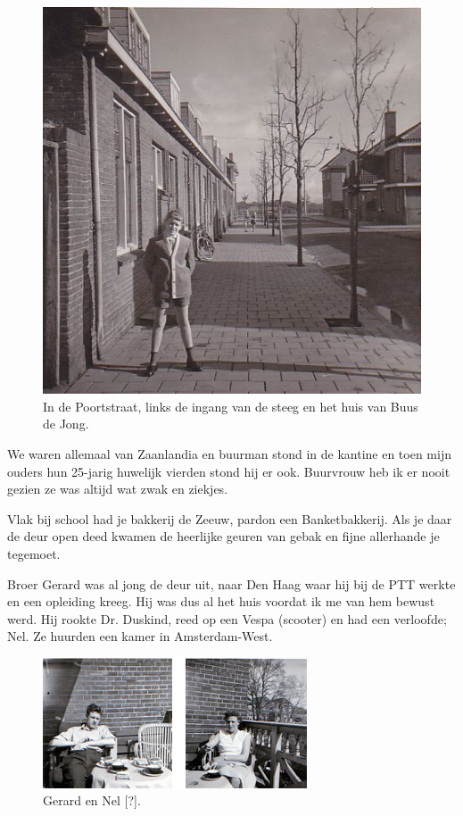 \documentclass[12pt,twoside, openright]{memoir}
\begin{document}
\begin{figure}
\includegraphics[width=\textwidth]{img/ch5/poortstrsteeg}
\caption*{\footnotesize In de Poortstraat, links de ingang van de steeg en het huis van Buus de Jong.}
\end{figure}

We waren allemaal van Zaanlandia en buurman stond in de kantine en toen mijn ouders hun 25-jarig huwelijk vierden stond hij er ook. Buurvrouw heb ik er nooit gezien ze was altijd wat zwak en ziekjes. 

Vlak bij school had je bakkerij de Zeeuw, pardon een Banketbakkerij. Als je daar de deur open deed kwamen de heerlijke geuren van gebak en fijne allerhande je tegemoet.

Broer Gerard was al jong de deur uit, naar Den Haag waar hij bij de PTT werkte en een opleiding kreeg. Hij was dus al het huis voordat ik me van hem bewust werd. Hij rookte Dr. Duskind, reed op een Vespa (scooter) en had een verloofde; Nel. Ze huurden een kamer in Amsterdam-West.

\begin{figure}
\includegraphics[width=\textwidth]{img/ch5/gn0102}
\caption*{\footnotesize Gerard en Nel [?].}
\end{figure}
\end{document}
